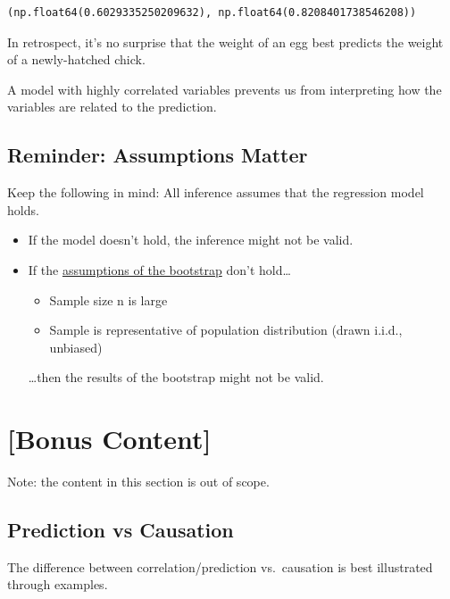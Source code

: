 \documentclass[
  letterpaper,
  DIV=11,
  numbers=noendperiod]{scrreprt}
\providecommand{\tightlist}{%
  \setlength{\itemsep}{0pt}\setlength{\parskip}{0pt}}\usepackage{longtable,booktabs,array}
\begin{document}
\begin{verbatim}
(np.float64(0.6029335250209632), np.float64(0.8208401738546208))
\end{verbatim}

In retrospect, it's no surprise that the weight of an egg best predicts
the weight of a newly-hatched chick.

A model with highly correlated variables prevents us from interpreting
how the variables are related to the prediction.

\subsection{Reminder: Assumptions
Matter}\label{reminder-assumptions-matter}

Keep the following in mind: All inference assumes that the regression
model holds.

\begin{itemize}
\tightlist
\item
  If the model doesn't hold, the inference might not be valid.
\item
  If the
  \href{https://inferentialthinking.com/chapters/13/3/Confidence_Intervals.html?highlight=p\%20value\%20confidence\%20interval\#care-in-using-the-bootstrap-percentile-method}{assumptions
  of the bootstrap} don't hold\ldots{}

  \begin{itemize}
  \tightlist
  \item
    Sample size n is large
  \item
    Sample is representative of population distribution (drawn i.i.d.,
    unbiased)
  \end{itemize}

  \ldots then the results of the bootstrap might not be valid.
\end{itemize}

\section{{[}Bonus Content{]}}\label{bonus-content}

Note: the content in this section is out of scope.

\subsection{Prediction vs Causation}\label{prediction-vs-causation}

The difference between correlation/prediction vs.~causation is best
illustrated through examples.
\end{document}
